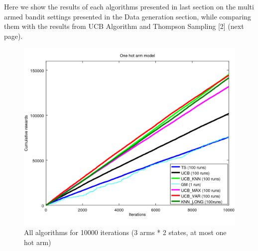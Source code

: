 \documentclass{article} %
\begin{document}
Here we show the results of each algorithms presented in last section on the multi
armed bandit settings presented in the Data generation section, while comparing them
with the results from UCB Algorithm and Thompson Sampling [2] (next page).

\begin{figure}[h]
	\begin{center}
		\includegraphics[width=1.0\textwidth]{all_10000it.png}
	\end{center}
	\caption{All algorithms for 10000 iterations (3 arms * 2 states, at most one hot arm)}
\end{figure}
\end{document}
